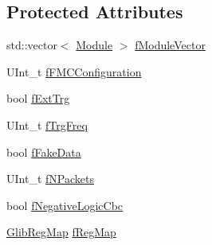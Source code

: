 \subsection*{Protected Attributes}
\begin{DoxyCompactItemize}
\item 
std\-::vector$<$ \hyperlink{class_ph2___hw_description_1_1_module}{Module} $>$ \hyperlink{class_ph2___hw_description_1_1_glib_a97b6535900b4fa8eef81c7e15a01cda4}{f\-Module\-Vector}
\item 
U\-Int\-\_\-t \hyperlink{class_ph2___hw_description_1_1_glib_a0b4360874e6f917bc885ddb767773daa}{f\-F\-M\-C\-Configuration}
\item 
bool \hyperlink{class_ph2___hw_description_1_1_glib_a8d044e2313a6cd839e54cf1bc06b76ca}{f\-Ext\-Trg}
\item 
U\-Int\-\_\-t \hyperlink{class_ph2___hw_description_1_1_glib_a5a6730e89d53faa23fefe8707e87cf00}{f\-Trg\-Freq}
\item 
bool \hyperlink{class_ph2___hw_description_1_1_glib_aad55f946f8358f642051404848e2fad3}{f\-Fake\-Data}
\item 
U\-Int\-\_\-t \hyperlink{class_ph2___hw_description_1_1_glib_a231ebdea549efb51e05824f4713f2d70}{f\-N\-Packets}
\item 
bool \hyperlink{class_ph2___hw_description_1_1_glib_a6953c6b57c202b9078bc87ddc1a09581}{f\-Negative\-Logic\-Cbc}
\item 
\hyperlink{namespace_ph2___hw_description_a1fd478712d074fa51fc2185802bbfd90}{Glib\-Reg\-Map} \hyperlink{class_ph2___hw_description_1_1_glib_a1a0c6dba5a24c615e8609b03012a8970}{f\-Reg\-Map}
\end{DoxyCompactItemize}


